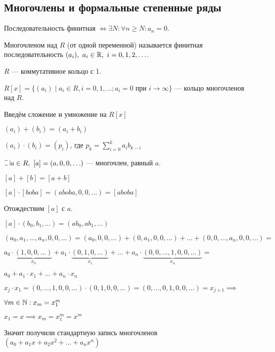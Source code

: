 \subsection{Многочлены и формальные степенные ряды}

\begin{defn}
    Последовательность финитная $\iff \exists N: \forall n \geq N: a_n = 0$.
\end{defn}

\begin{defn}
    Многочленом над $R$ (от одной переменной) называется финитная последовательность $(a_i),~a_i \in \mathbb{R},~i=0,1,2,\ldots$.
\end{defn}

\begin{defn}
    $R$ --- коммутативное кольцо с 1.

    $R[x] = \{(a_i) \mid a_i \in R, i = 0, 1, \ldots; a_i = 0$ при $i \to \infty \}$ --- кольцо многочленов над $R$.
\end{defn}


Введём сложение и умножение на $R[x]$

$(a_i) + (b_i) = (a_i + b_i)$

$(a_i) \cdot (b_i) = (p_i)$, где $p_k = \sum\limits_{i=0}^k a_i b_{k-i}$

$\letus a \in R,~[a] = (a, 0, 0, \ldots)$ --- многочлен, равный $a$.

$[a] + [b] = [a + b]$

$[a] \cdot [boba] = (aboba, 0, 0, \ldots) = [aboba]$

Отождествим $[a]$ с $a$.

$[a] \cdot (b_0, b_1, \ldots) = (ab_0, ab_1, \ldots)$

$(a_0, a_1, \ldots, a_n, 0, 0, \ldots) = (a_0, 0, 0, \ldots) + (0, a_1, 0, 0, \ldots) + \ldots + (0, 0, \ldots, a_n, 0, 0, \ldots) =$ 

$a_0 \cdot \underbrace{(1, 0, 0, \ldots)}_{x_0} + a_1 \cdot \underbrace{(0, 1, 0, \ldots)}_{x_1} + \ldots + a_n \cdot \underbrace{(0, 0, \ldots, 1, 0, 0, \ldots)}_{x_n} =$

$a_0 + a_1 \cdot x_1 + \ldots + a_n \cdot x_n$

$x_j \cdot x_1 = (0, \ldots, 1, 0, 0, \ldots) \cdot (0, 1, 0, 0, \ldots) = (0, \ldots, 0, 1, 0, 0, \ldots) = x_{j+1} \implies$

$\forall m \in \mathbb{N}: x_m = x_1^m$

$x_1 = x \implies x_m = x_1^m = x^m$

Значит получили стандартную запись многочленов $(a_0 + a_1 x + a_2 x^2 + \ldots + a_n x^n)$

